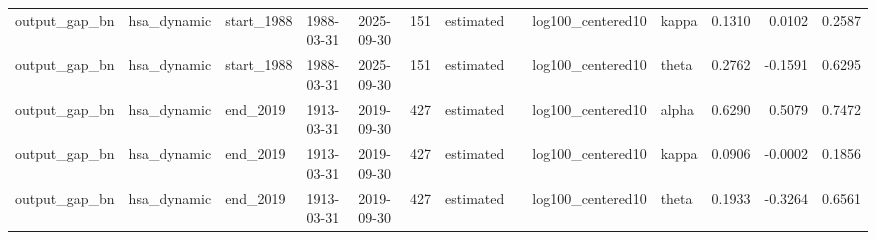 \begin{tabular}{lllllrllllrrr}
output\_gap\_bn & hsa\_dynamic & start\_1988 & 1988-03-31 & 2025-09-30 & 151 & estimated &  & log100\_centered10 & kappa & 0.1310 & 0.0102 & 0.2587 \\
output\_gap\_bn & hsa\_dynamic & start\_1988 & 1988-03-31 & 2025-09-30 & 151 & estimated &  & log100\_centered10 & theta & 0.2762 & -0.1591 & 0.6295 \\
output\_gap\_bn & hsa\_dynamic & end\_2019 & 1913-03-31 & 2019-09-30 & 427 & estimated &  & log100\_centered10 & alpha & 0.6290 & 0.5079 & 0.7472 \\
output\_gap\_bn & hsa\_dynamic & end\_2019 & 1913-03-31 & 2019-09-30 & 427 & estimated &  & log100\_centered10 & kappa & 0.0906 & -0.0002 & 0.1856 \\
output\_gap\_bn & hsa\_dynamic & end\_2019 & 1913-03-31 & 2019-09-30 & 427 & estimated &  & log100\_centered10 & theta & 0.1933 & -0.3264 & 0.6561 \\
\bottomrule
\end{tabular}
